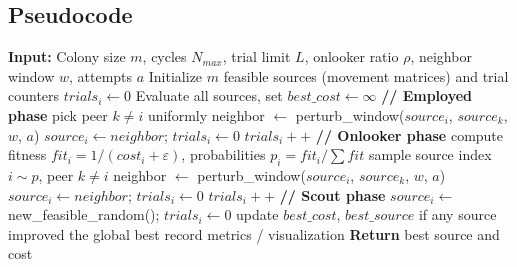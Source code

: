 \subsection{Pseudocode}

\begin{algorithm}[H]
\caption{Artificial Bee Colony for Multi-Robot Path Planning}
\begin{algorithmic}[1]
\State \textbf{Input:} Colony size $m$, cycles $N_{max}$, trial limit $L$, onlooker ratio $\rho$, neighbor window $w$, attempts $a$
\State Initialize $m$ feasible sources (movement matrices) and trial counters $trials_i \gets 0$
\State Evaluate all sources, set $best\_cost \gets \infty$
    \State \textbf{// Employed phase}
        \State pick peer $k \neq i$ uniformly
        \State neighbor $\gets$ perturb\_window($source_i$, $source_k$, $w$, $a$)
         \State $source_i \gets neighbor$; $trials_i \gets 0$ \Else \State $trials_i{+}{+}$ \EndIf
    \EndFor
    \State \textbf{// Onlooker phase}
    \State compute fitness $fit_i = 1/(cost_i+\varepsilon)$, probabilities $p_i = fit_i/\sum fit$
        \State sample source index $i \sim p$, peer $k \neq i$
        \State neighbor $\gets$ perturb\_window($source_i$, $source_k$, $w$, $a$)
         \State $source_i \gets neighbor$; $trials_i \gets 0$ \Else \State $trials_i{+}{+}$ \EndIf
    \EndFor
    \State \textbf{// Scout phase}
         \State $source_i \gets$ new\_feasible\_random(); $trials_i \gets 0$ \EndIf
    \EndFor
    \State update $best\_cost$, $best\_source$ if any source improved the global best
    \State record metrics / visualization
\EndFor
\State \textbf{Return} best source and cost
\end{algorithmic}
\end{algorithm}
